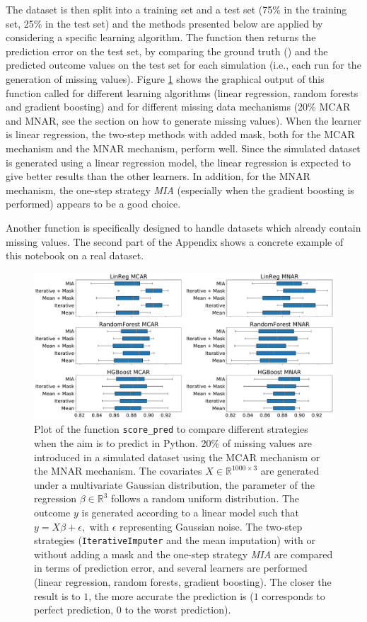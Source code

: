 The dataset is then split into a training set and a test set (75\% in the training set, 25\% in the test set) and the methods presented below are applied by considering a specific learning algorithm. The function then returns the prediction error on the test set, by comparing the ground truth () and the predicted outcome values on the test set for each simulation (i.e., each run for the generation of missing values). Figure \ref{fig:workflows2} shows the graphical output of this function called for different learning algorithms (linear regression, random forests and gradient boosting) and for different missing data mechanisms (20\% MCAR and MNAR, see the section on how to generate missing values). 
When the learner is linear regression, the two-step methods with added mask, both for the MCAR mechanism and the MNAR mechanism, perform well. Since the simulated dataset is generated using a linear regression model, the linear regression is expected to give better results than the other learners. In addition, for the MNAR mechanism, the one-step strategy \textit{MIA} (especially when the gradient boosting is performed) appears to be a good choice. 

Another function is specifically designed to handle datasets which already contain missing values. The second part of the Appendix shows a concrete example of this notebook on a real dataset. 

\begin{figure}
\centering
\includegraphics[width=1\textwidth]{figures/predict3.pdf}
\caption{\label{fig:workflows2} Plot of the function \texttt{score\_pred} to compare different strategies when the aim is to predict in {Python}. 20\% of missing values are introduced in a simulated dataset using the MCAR mechanism or the MNAR mechanism. The covariates $X\in \mathbb{R}^{1000\times 3}$ are generated under a multivariate Gaussian distribution, the parameter of the regression $\beta \in \mathbb{R}^3$ follows a random uniform distribution. The outcome $y$ is generated according to a linear  model such that $y=X\beta+\epsilon,$ with $\epsilon$ representing Gaussian noise. The two-step strategies (\texttt{IterativeImputer} and the mean imputation) with or without adding a mask and the one-step strategy \textit{MIA} are compared in terms of prediction error, and several learners are performed (linear regression, random forests, gradient boosting). The closer the result is to $1$, the more accurate the prediction is ($1$ corresponds to perfect prediction, $0$ to the worst prediction).}
\end{figure}


